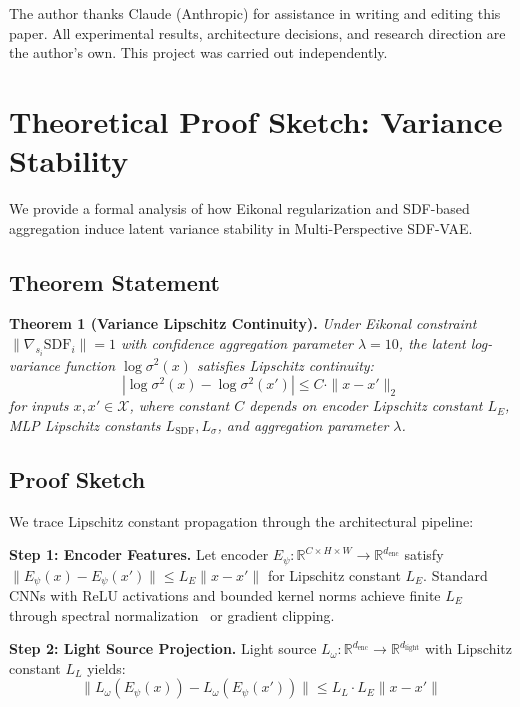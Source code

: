 \documentclass[10pt,twocolumn,letterpaper]{article}
\begin{document}
The author thanks Claude (Anthropic) for assistance in writing and editing this paper. All experimental results, architecture decisions, and research direction are the author's own. This project was carried out independently.

\appendix

\section{Theoretical Proof Sketch: Variance Stability}
\label{app:theory}

We provide a formal analysis of how Eikonal regularization and SDF-based aggregation induce latent variance stability in Multi-Perspective SDF-VAE.

\subsection{Theorem Statement}

\textbf{Theorem 1 (Variance Lipschitz Continuity).} \textit{Under Eikonal constraint $\|\nabla_{s_i} \text{SDF}_i\| = 1$ with confidence aggregation parameter $\lambda=10$, the latent log-variance function $\log \sigma^2(x)$ satisfies Lipschitz continuity:}
\[
|\log \sigma^2(x) - \log \sigma^2(x')| \leq C \cdot \|x - x'\|_2
\]
\textit{for inputs $x, x' \in \mathcal{X}$, where constant $C$ depends on encoder Lipschitz constant $L_E$, MLP Lipschitz constants $L_{\text{SDF}}, L_{\sigma}$, and aggregation parameter $\lambda$.}

\subsection{Proof Sketch}

We trace Lipschitz constant propagation through the architectural pipeline:

\textbf{Step 1: Encoder Features.} Let encoder $E_\psi: \mathbb{R}^{C \times H \times W} \to \mathbb{R}^{d_{\text{enc}}}$ satisfy $\|E_\psi(x) - E_\psi(x')\| \leq L_E \|x - x'\|$ for Lipschitz constant $L_E$. Standard CNNs with ReLU activations and bounded kernel norms achieve finite $L_E$ through spectral normalization~\cite{miyato2018spectral} or gradient clipping.

\textbf{Step 2: Light Source Projection.} Light source $L_\omega: \mathbb{R}^{d_{\text{enc}}} \to \mathbb{R}^{d_{\text{light}}}$ with Lipschitz constant $L_L$ yields:
\[
\|L_\omega(E_\psi(x)) - L_\omega(E_\psi(x'))\| \leq L_L \cdot L_E \|x - x'\|
\]
\end{document}
